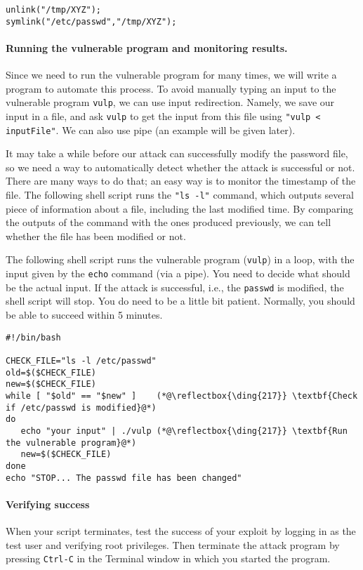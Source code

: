 \begin{lstlisting}
unlink("/tmp/XYZ");
symlink("/etc/passwd","/tmp/XYZ");
\end{lstlisting}



\paragraph{Running the vulnerable program and monitoring results.}
Since we need to run the vulnerable program for many
times, we will write a program to automate this process. 
To avoid manually typing an input to the vulnerable program \texttt{vulp}, 
we can use input redirection. Namely, we save our input in a file, and ask
\texttt{vulp} to get the input from this file using \texttt{"vulp <
inputFile"}. We can also use pipe (an example will be given later). 

It may take a while before our attack can successfully modify the
password file, so we need a way to automatically detect whether the attack is
successful or not. There are many ways to do that; an easy way 
is to monitor the timestamp of the file.
The following shell script runs the \texttt{"ls -l"} command, which
outputs several piece of information about a
file, including the last modified time. By comparing the outputs of the
command with the ones produced previously, we can tell
whether the file has been modified or not. 

The following shell script runs the vulnerable program (\texttt{vulp}) in a loop,
with the input given by the \texttt{echo} command (via a pipe).  
You need to decide what should be the actual input. 
If the attack is successful, i.e.,
the \texttt{passwd} is modified, the shell script will stop. 
You do need to be a little bit patient. 
Normally, you should be able to succeed within 5 minutes. 

\begin{lstlisting}
#!/bin/bash

CHECK_FILE="ls -l /etc/passwd"
old=$($CHECK_FILE)
new=$($CHECK_FILE)
while [ "$old" == "$new" ]    (*@\reflectbox{\ding{217}} \textbf{Check if /etc/passwd is modified}@*)
do
   echo "your input" | ./vulp (*@\reflectbox{\ding{217}} \textbf{Run the vulnerable program}@*)
   new=$($CHECK_FILE)
done
echo "STOP... The passwd file has been changed"
\end{lstlisting}

\paragraph{Verifying success}
When your script terminates,
test the success of your exploit by logging in as the test user and
verifying root privileges.  Then terminate the attack program by 
pressing \texttt{Ctrl-C} in the Terminal window in which you started the program.


